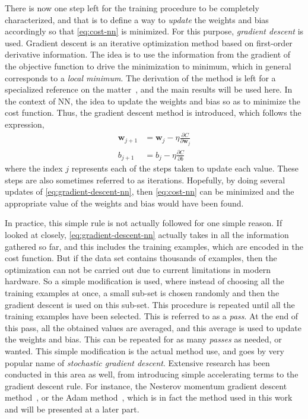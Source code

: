 There is now one step left for the training procedure to be completely characterized, and 
that is to define a way to \emph{update} the weights and bias accordingly so that 
\autoref{eq:cost-nn} is minimized. For this purpose, \emph{gradient descent} is used. 
Gradient descent is an iterative optimization method based on first-order derivative 
information. The idea is to use the information from the gradient of the objective function 
to drive the minimization to minimum, which in general corresponds to a \emph{local minimum}. The derivation of the method is left for a specialized reference on the 
matter~\cite{nocedalNumericalOptimization2006}, and the main results will be used here. In 
the context of NN, the idea to update the weights and bias so as to minimize the cost 
function. Thus, the gradient descent method is introduced, which follows the expression,
\begin{equation}
    \begin{aligned}
        \bm{w}_{j+1} &= \bm{w}_{j} - \eta \frac{\partial C}{\partial \bm{w}_{j}} \\
        b_{j+1} &= b_{j} - \eta \frac{\partial C}{\partial b}
    \end{aligned}
    \label{eq:gradient-descent-nn}
\end{equation}
where the index \(j\) represents each of the steps taken to update each value. These steps 
are also sometimes referred to as iterations. Hopefully, by doing several updates of 
\autoref{eq:gradient-descent-nn}, then \autoref{eq:cost-nn} can be minimized and the 
appropriate value of the weights and bias would have been found.

In practice, this simple rule is not actually followed for one simple reason. If looked at 
closely, \autoref{eq:gradient-descent-nn} actually takes in all the information gathered so 
far, and this includes the training examples, which are encoded in the cost function. But 
if the data set contains thousands of examples, then the optimization can not be carried 
out due to current limitations in modern hardware. So a simple modification is used, where 
instead of choosing all the training examples at once, a small sub-set is chosen randomly 
and then the gradient descent is used on this sub-set. 
This procedure is repeated until all the 
training examples have been selected. This is referred to as a 
\emph{pass}. At the end of this pass, all the obtained values are averaged, and this 
average is used to update the weights and bias. This can be repeated for as many 
\emph{passes} as needed, or wanted. This simple modification is the actual 
method use, and goes by very popular name of \emph{stochastic gradient descent}.
Extensive research has been conducted in this area as well, from introducing simple
accelerating terms to the gradient descent rule. For instance, the Nesterov momentum 
gradient descent method~\cite{ruderOverviewGradientDescent2017}, or the Adam 
method~\cite{kingmaAdamMethodStochastic2017}, which is in fact the method used in this work 
and will be presented at a later part.

